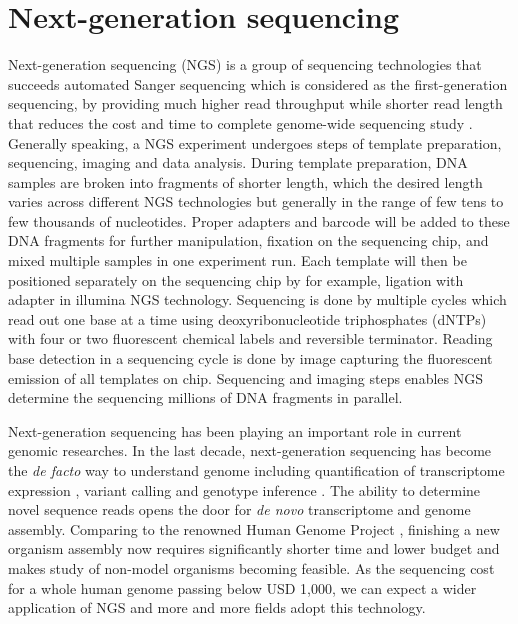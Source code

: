 \section{Next-generation sequencing}
\label{s:ngs}

Next-generation sequencing (NGS) is a group of sequencing technologies that
succeeds automated Sanger sequencing which is considered as the first-generation
sequencing, by providing much higher read throughput while shorter read length
that reduces the cost and time to complete genome-wide sequencing study
\cite{metzker2010:sequencing}. Generally speaking, a NGS experiment undergoes
steps of template preparation, sequencing, imaging and data analysis. During
template preparation, DNA samples are broken into fragments of shorter length,
which the desired length varies across different NGS technologies but generally
in the range of few tens to few thousands of nucleotides. Proper adapters and
barcode will be added to these DNA fragments for further manipulation, fixation
on the sequencing chip, and mixed multiple samples in one experiment run. Each
template will then be positioned separately on the sequencing chip by for
example, ligation with adapter in illumina NGS technology. Sequencing is done
by multiple cycles which read out one base at a time using deoxyribonucleotide
triphosphates (dNTPs) with four or two fluorescent chemical labels and
reversible terminator. Reading base detection in a sequencing cycle is done by
image capturing the fluorescent emission of all templates on chip. Sequencing
and imaging steps enables NGS determine the sequencing millions of DNA
fragments in parallel.

Next-generation sequencing has been playing an important role in current
genomic researches. In the last decade, next-generation sequencing has become
the \textit{de facto} way to understand genome \cite{vandijk2014:ten} including
quantification of transcriptome expression \cite{wang2009:rnaseq}, variant
calling and genotype inference \cite{nielsen2011:genotype}. The ability to
determine novel sequence reads opens the door for \textit{de novo}
transcriptome and genome assembly. Comparing to the renowned Human Genome
Project \cite{lander2001:initial}, finishing a new organism assembly now
requires significantly shorter time and lower budget and makes study of
non-model organisms becoming feasible. As the sequencing cost for a whole human
genome passing below USD 1,000, we can expect a wider application of NGS and
more and more fields adopt this technology.



